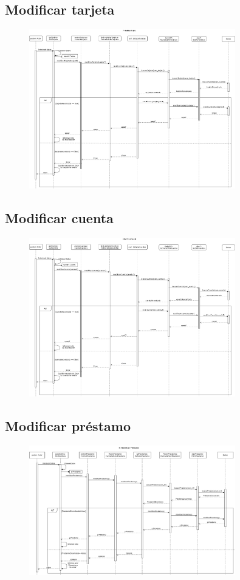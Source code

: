 \documentclass[12pt]{article}
\begin{document}
\subsection{Modificar tarjeta}
\begin{figure}[H]
    \centering
    \includegraphics[width=0.8\textwidth]{images/7-Gestor_modifica_tarjeta.png}
\end{figure}
\subsection{Modificar cuenta}
\begin{figure}[H]
    \centering
    \includegraphics[width=0.8\textwidth]{images/8-Gestor_modifica_cuenta.png}
\end{figure}
\subsection{Modificar préstamo}
\begin{figure}[H]
    \centering
    \includegraphics[width=0.8\textwidth]{images/9._GestorModificaPrestamo.png}
\end{figure}
\end{document}
